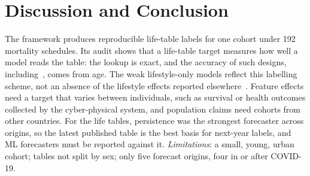 \documentclass[runningheads]{llncs}
\begin{document}
\section{Discussion and Conclusion}

The framework produces reproducible life-table labels for one cohort under 192 mortality
schedules. Its audit shows that a life-table target measures how well a model reads the table: the
lookup is exact, and the accuracy of such designs, including~\cite{bopushova2026}, comes from age.
The weak lifestyle-only models reflect this labelling scheme, not an absence of the lifestyle effects
reported elsewhere~\cite{chinthaginjala2026b,vladimirskaya2023,jackowska2024}. Feature effects need a
target that varies between individuals, such as survival or health outcomes collected by the
cyber-physical system, and population claims need cohorts from other countries. For the life
tables, persistence was the strongest forecaster across origins, so the latest published table is
the best basis for next-year labels, and ML forecasters must be reported against it.
\emph{Limitations}: a small, young, urban cohort; tables not split by sex; only five forecast
origins, four in or after COVID-19.
\end{document}
